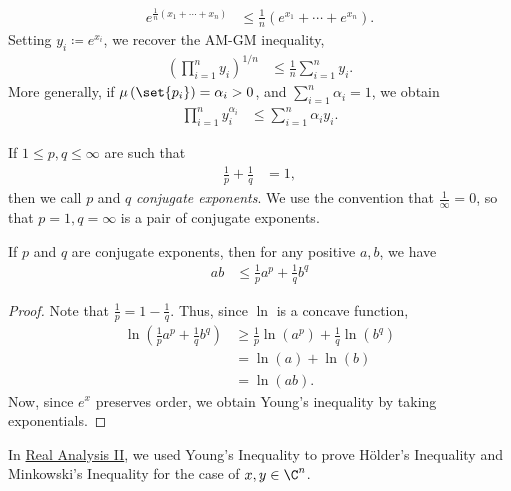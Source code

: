 \documentclass[12pt]{mypackage}
\begin{document}
\begin{align*}
  e^{\frac{1}{n}\left( x_1 + \cdots + x_n \right)} &\leq \frac{1}{n}\left( e^{x_1} + \cdots + e^{x_n} \right).
\end{align*}
Setting $y_i\coloneq e^{x_i}$, we recover the AM-GM inequality,
\begin{align*}
  \left( \prod_{i=1}^{n}y_i \right)^{1/n} &\leq \frac{1}{n}\sum_{i=1}^{n}y_i.
\end{align*}
More generally, if $\mu\left( \set{p_i} \right) = \alpha_i > 0$, and $\sum_{i=1}^{n}\alpha_i = 1$, we obtain
\begin{align*}
  \prod_{i=1}^{n}y_i^{\alpha_i} &\leq \sum_{i=1}^{n}\alpha_iy_i.
\end{align*}
\begin{definition}
  If $1 \leq p,q \leq \infty$ are such that
  \begin{align*}
    \frac{1}{p} + \frac{1}{q} &= 1,
  \end{align*}
  then we call $p$ and $q$ \textit{conjugate exponents}. We use the convention that $\frac{1}{\infty} = 0$, so that $p=1,q=\infty$ is a pair of conjugate exponents.
\end{definition}
\begin{theorem}
  If $p$ and $q$ are conjugate exponents, then for any positive $a,b$, we have
  \begin{align*}
    ab &\leq \frac{1}{p}a^p + \frac{1}{q}b^q
  \end{align*}
\end{theorem}
\begin{proof}
  Note that $\frac{1}{p} = 1 - \frac{1}{q}$. Thus, since $\ln$ is a concave function,
  \begin{align*}
    \ln\left( \frac{1}{p}a^p + \frac{1}{q}b^{q} \right) &\geq \frac{1}{p}\ln\left( a^{p} \right) + \frac{1}{q}\ln\left( b^{q} \right)\\
                                                        &= \ln\left( a \right) + \ln\left( b \right)\\
                                                        &= \ln\left( ab \right).
  \end{align*}
  Now, since $e^{x}$ preserves order, we obtain Young's inequality by taking exponentials.
\end{proof}
In \href{https://ai.avinash-iyer.com/Classes_and_Homework/College/Y3/Y3S2,\%20Real\%20II/real_2_notes.pdf}{Real Analysis II}, we used Young's Inequality to prove Hölder's Inequality and Minkowski's Inequality for the case of $x,y\in \C^{n}$.
\end{document}

